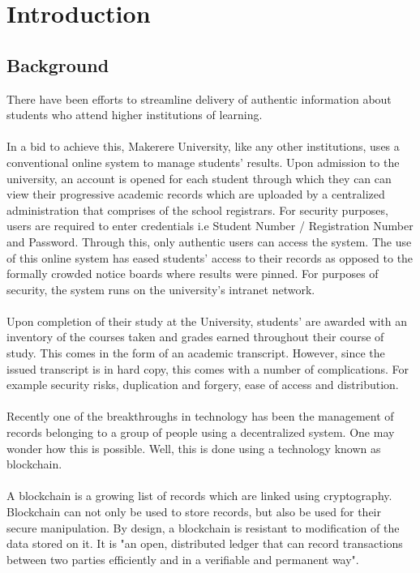 \chapter{Introduction}

\section{Background}
There have been efforts to streamline delivery of authentic information about students who attend higher institutions of learning. \\~\\
In a bid to achieve this, Makerere University, like any other institutions, uses a conventional online system to manage students' results. Upon admission to the university, an account is opened for each student through which they can can view their progressive academic records which are uploaded by a centralized administration that comprises of the school registrars. For security purposes, users are required to enter credentials i.e Student Number / Registration Number and Password. Through this, only authentic users can access the system. The use of this online system has eased students' access to their records as opposed to the formally crowded notice boards where results were pinned. For purposes of security, the system runs on the university's intranet network. \\~\\
Upon completion of their study at the University, students' are awarded with an inventory of the courses taken and grades earned throughout their course of study. This comes in the form of an academic transcript. However, since the issued transcript is in hard copy, this comes with a number of complications. For example security risks, duplication and forgery, ease of access and distribution.\\\\
Recently one of the breakthroughs in technology has been the management of records belonging to a group of people using a decentralized system. One may wonder how this is possible. Well, this is done using a technology known as blockchain.\\\\
A blockchain is a growing list of records which are linked using cryptography\cite{art1}. Blockchain can not only be used to store records, but also be used for their secure manipulation. By design, a blockchain is resistant to modification of the data stored on it. It is "an open, distributed ledger that can record transactions between two parties efficiently and in a verifiable and permanent way".\\\\
